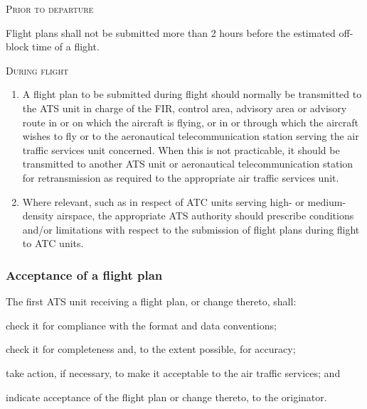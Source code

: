 \documentclass[../vATM.tex]{subfiles}
\begin{document}
    \begin{enumeratesc}
        \item \textsc{Prior to departure}
        \begin{enumempty}
            \item Flight plans shall not be submitted more than 2 hours before the estimated off-block time of a flight.
        \end{enumempty}

        \item \textsc{During flight}
        \begin{enumerate}
            \item A flight plan to be submitted during flight should normally be transmitted to the ATS unit in charge of the FIR, control area, advisory area or advisory route in or on which the aircraft is flying, or in or through which the aircraft wishes to fly or to the aeronautical telecommunication station serving the air traffic services unit concerned. When this is not practicable, it should be transmitted to another ATS unit or aeronautical telecommunication station for retransmission as required to the appropriate air traffic services unit.
            \item Where relevant, such as in respect of ATC units serving high- or medium-density airspace, the appropriate ATS authority should prescribe conditions and/or limitations with respect to the submission of flight plans during flight to ATC units.

        \end{enumerate}
    \end{enumeratesc}

    \subsubsection{Acceptance of a flight plan}

    The first ATS unit receiving a flight plan, or change thereto, shall:

    \begin{enumalph}
        \item check it for compliance with the format and data conventions;
        \item check it for completeness and, to the extent possible, for accuracy;
        \item take action, if necessary, to make it acceptable to the air traffic services; and
        \item indicate acceptance of the flight plan or change thereto, to the originator.
    \end{enumalph}
\end{document}
